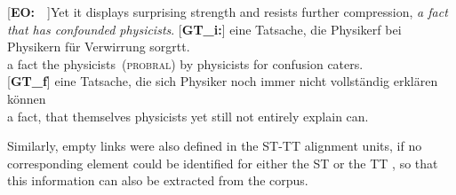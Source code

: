 \documentclass[output=paper]{LSP/langsci}
\begin{document}
\ea \label{ex:1:3}
\begin{xlist}
\exi{}[\textbf{EO:}~~]{Yet it displays surprising strength and resists further compression, \emph{a fact that has confounded physicists}.}
\exi{}[\textbf{GT\_i:}]{
\gll \raute\stern\stern{} eine{\raute} Tatsache,{\raute} die{\raute} Physikerf\raute\stern\pfeil\pfeil\raute{\color{red}[{\stern}11.968]}\pfeil\pfeil\pfeil\pfeil\pfeil\pfeil\pfeil\pfeil\pfeil{} bei\raute{} Physikern\raute{} für\raute{} Verwirrung\raute{} sorgrt\pfeil\pfeil{}t.\\
 {} a fact the physicists~(\textsc{probral}) by physicists for confusion caters.\\
}
\exi{}[\textbf{GT\_f}]{
\gll  eine Tatsache, die sich Physiker noch immer nicht vollständig erklären können\\
  a fact, that themselves physicists yet still not entirely explain can.\\
}
\end{xlist}
\z

Similarly, empty links were also defined in the ST-TT alignment units, if no corresponding element could be identified for either the ST or the TT \citep{Culo2012}, so that this information can also be extracted from the corpus.    
\end{document}
